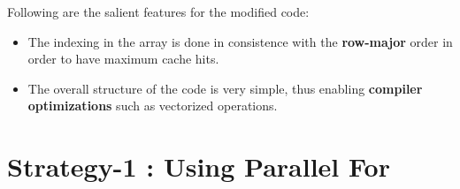 \documentclass[12pt]{article}
\begin{document}
Following are the salient features for the modified code:
\begin{itemize}
  \item The indexing in the array is done in consistence with the \textbf{row-major} order in order to have maximum cache hits.
  \item The overall structure of the code is very simple, thus enabling \textbf{compiler optimizations} such as vectorized operations.
\end{itemize}





\newpage

\section*{Strategy-1 : Using Parallel For}
\end{document}
